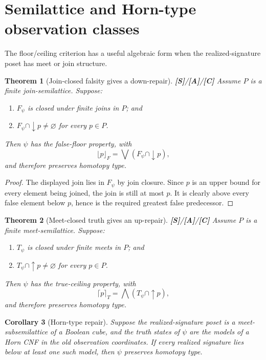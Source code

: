 \documentclass[11pt]{article}
\newtheorem{theorem}{Theorem}[section]
\newtheorem{corollary}[theorem]{Corollary}
\theoremstyle{definition}
\newcommand{\statusS}{\textbf{[S]}}
\newcommand{\statusA}{\textbf{[A]}}
\newcommand{\statusC}{\textbf{[C]}}
\begin{document}
\section{Semilattice and Horn-type observation classes}

The floor/ceiling criterion has a useful algebraic form when the realized-signature poset has meet or join structure.

\begin{theorem}[Join-closed falsity gives a down-repair]\label{thm:joinfalse}
\statusS/\statusA/\statusC\;
Assume $P$ is a finite join-semilattice. Suppose:
\begin{enumerate}[label=(\roman*)]
\item $F_\psi$ is closed under finite joins in $P$; and
\item $F_\psi\cap\downarrow p\ne\varnothing$ for every $p\in P$.
\end{enumerate}
Then $\psi$ has the false-floor property, with
\[
\lfloor p\rfloor_F
=
\bigvee(F_\psi\cap\downarrow p),
\]
and therefore preserves homotopy type.
\end{theorem}

\begin{proof}
The displayed join lies in $F_\psi$ by join closure. Since $p$ is an upper bound for every element being joined, the join is still at most $p$. It is clearly above every false element below $p$, hence is the required greatest false predecessor.
\end{proof}

\begin{theorem}[Meet-closed truth gives an up-repair]\label{thm:meettrue}
\statusS/\statusA/\statusC\;
Assume $P$ is a finite meet-semilattice. Suppose:
\begin{enumerate}[label=(\roman*)]
\item $T_\psi$ is closed under finite meets in $P$; and
\item $T_\psi\cap\uparrow p\ne\varnothing$ for every $p\in P$.
\end{enumerate}
Then $\psi$ has the true-ceiling property, with
\[
\lceil p\rceil_T
=
\bigwedge(T_\psi\cap\uparrow p),
\]
and therefore preserves homotopy type.
\end{theorem}

\begin{corollary}[Horn-type repair]\label{cor:horn}
Suppose the realized-signature poset is a meet-subsemilattice of a Boolean cube, and the truth states of $\psi$ are the models of a Horn CNF in the old observation coordinates. If every realized signature lies below at least one such model, then $\psi$ preserves homotopy type.
\end{corollary}
\end{document}
